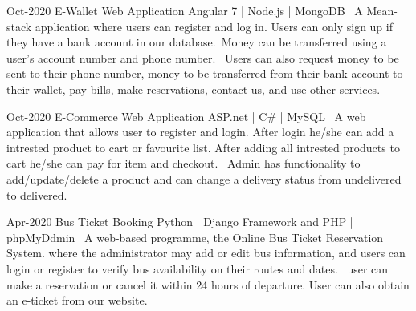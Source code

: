 \documentclass[]{cv-style}
\begin{document}
\begin{entrylist}
\entry
{Oct-2020}
{E-Wallet Web Application}
{Angular 7 | Node.js | MongoDB }
{ \textbullet\, A Mean-stack application where users can register and log in. Users can only sign up if they have a bank account in our database.\newline     \textbullet\, Money can be transferred using a user's account number and phone number. \newline
 \textbullet\, Users can also request money to be sent to their phone number, money to be transferred from their bank account to their wallet, pay bills, make reservations, contact us, and use other services.}
{\vspace{-0.3cm}}
\end{entrylist}

\begin{entrylist}
\entry
{Oct-2020}
{E-Commerce Web Application}
{ASP.net | C\# | MySQL }
{ \textbullet\, A web application that allows user to register and login. After login he/she can add a intrested product to cart or favourite list. After adding all intrested products to cart he/she can pay for item and checkout.\newline
 \textbullet\, Admin has functionality to add/update/delete a product and can change a delivery status from undelivered to delivered.}
{\vspace{-0.3cm}}


\end{entrylist}

\begin{entrylist}
\entry
{Apr-2020}
{Bus Ticket Booking}
{Python | Django Framework and PHP | phpMyDdmin}
{ \textbullet\, A web-based programme, the Online Bus Ticket Reservation System. where the administrator may add or edit bus information, and users can login or register to verify bus availability on their routes and dates.\newline
 \textbullet\, user can make a reservation or cancel it within 24 hours of departure. User can also obtain an e-ticket from our website.}
{\vspace{-0.3cm}}


\end{entrylist}

\end{document}
